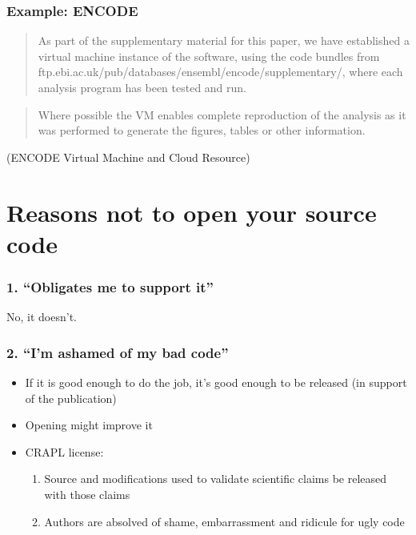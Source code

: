 \documentclass[slidestop]{beamer}
\begin{document}
\begin{frame}
  \frametitle{Example: ENCODE}
  \begin{quote}
    As part of the supplementary material for this paper, we have established
    a virtual machine instance of the software, using the code bundles from
    ftp.ebi.ac.uk/pub/databases/ensembl/encode/supplementary/, where each
    analysis program has been tested and run.
  \end{quote}
  \begin{quote}
    Where possible the VM enables complete reproduction of the analysis as it
    was performed to generate the figures, tables or other information.
  \end{quote}
  (ENCODE Virtual Machine and Cloud Resource)
\end{frame}

\section*{}


\section{Reasons not to open your source code}

\begin{frame}
  \frametitle{1. ``Obligates me to support it''}
  \pause
  No, it doesn't.
\end{frame}

{
  \frame{}
}

\begin{frame}
  \frametitle{2. ``I'm ashamed of my bad code''}
  \pause
  \begin{itemize}[<+->]
    \item If it is good enough to do the job, it's good enough to be released
      (in support of the publication)
    \item Opening might improve it
    \item CRAPL license:
      \begin{enumerate}
        \item Source and modifications used to validate scientific claims be
          released with those claims
        \item Authors are absolved of shame, embarrassment and ridicule for
          ugly code
      \end{enumerate}
  \end{itemize}
\end{frame}
\end{document}
